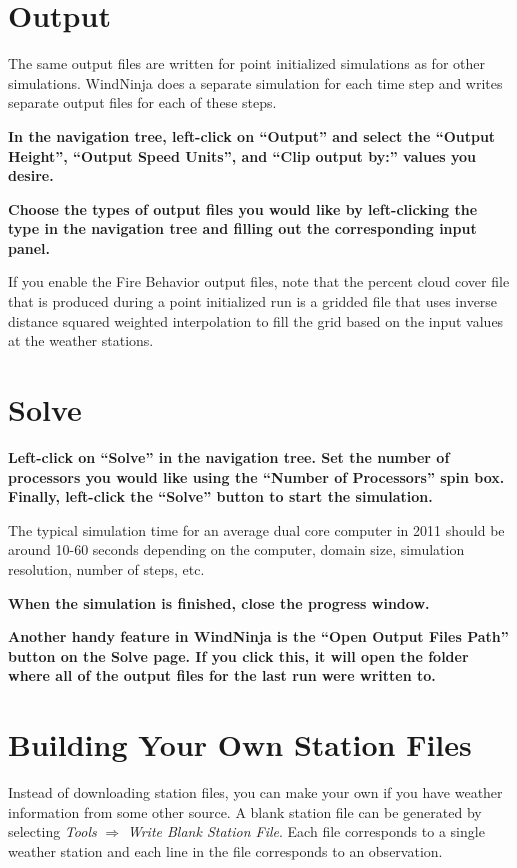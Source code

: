 \documentclass[12pt]{article}
\begin{document}
\section{Output}

The same output files are written for point initialized simulations as for other simulations. WindNinja does a separate simulation for each time step and writes separate output files for each of these steps.

\textbf{\color{red} In the navigation tree, left-click on “Output” and select the “Output Height”, “Output Speed Units”, and  “Clip output by:” values you desire.}

\textbf{\color{red} Choose the types of output files you would like by left-clicking the type in the navigation tree and filling out the corresponding input panel.}

If you enable the Fire Behavior output files, note that the percent cloud cover file that is produced during a point initialized run is a gridded file that uses inverse distance squared weighted interpolation to fill the grid based on the input values at the weather stations.

\section{Solve}

\textbf{\color{red}Left-click on “Solve” in the navigation tree.  Set the number of processors you would like using the “Number of Processors” spin box.  Finally, left-click the “Solve” button to start the simulation.}

The typical simulation time for an average dual core computer in 2011 should be around 10-60 seconds depending on the computer, domain size, simulation resolution, number of steps, etc.

\textbf{\color{red} When the simulation is finished, close the progress window.}

\textbf{\color{red}Another handy feature in WindNinja is the “Open Output Files Path” button on the Solve page.  If you click this, it will open the folder where all of the output files for the last run were written to.}

\section{Building Your Own Station Files}\label{growyourown}

Instead of downloading station files, you can make your own if you have weather information from some other source.  A blank station file can be generated by selecting \textit{Tools} $\Rightarrow$ \textit{Write Blank Station File}. Each file corresponds to a single weather station and each line in the file corresponds to an observation.
\end{document}
